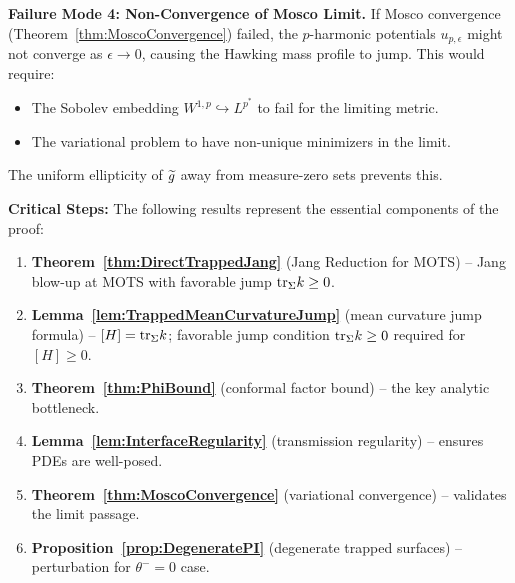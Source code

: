\begin{remark}
\textbf{Failure Mode 4: Non-Convergence of Mosco Limit.}
If Mosco convergence (Theorem~\ref{thm:MoscoConvergence}) failed, the $p$-harmonic potentials $u_{p,\epsilon}$ might not converge as $\epsilon \to 0$, causing the Hawking mass profile to jump. This would require:
\begin{itemize}
    \item The Sobolev embedding $W^{1,p} \hookrightarrow L^{p^*}$ to fail for the limiting metric.
    \item The variational problem to have non-unique minimizers in the limit.
\end{itemize}
The uniform ellipticity of $\widetilde{g}$ away from measure-zero sets prevents this.

\textbf{Critical Steps:}
The following results represent the essential components of the proof:
\begin{enumerate}
    \item \textbf{Theorem~\ref{thm:DirectTrappedJang}} (Jang Reduction for MOTS) -- Jang blow-up at MOTS with favorable jump $\mathrm{tr}_\Sigma k \ge 0$.
    \item \textbf{Lemma~\ref{lem:TrappedMeanCurvatureJump}} (mean curvature jump formula) -- $[H] = \mathrm{tr}_\Sigma k$; favorable jump condition $\mathrm{tr}_\Sigma k \ge 0$ required for $[H] \ge 0$.
    \item \textbf{Theorem~\ref{thm:PhiBound}} (conformal factor bound) -- the key analytic bottleneck.
    \item \textbf{Lemma~\ref{lem:InterfaceRegularity}} (transmission regularity) -- ensures PDEs are well-posed.
    \item \textbf{Theorem~\ref{thm:MoscoConvergence}} (variational convergence) -- validates the limit passage.
    \item \textbf{Proposition~\ref{prop:DegeneratePI}} (degenerate trapped surfaces) -- perturbation for $\theta^- = 0$ case.
\end{enumerate}
\end{remark}

